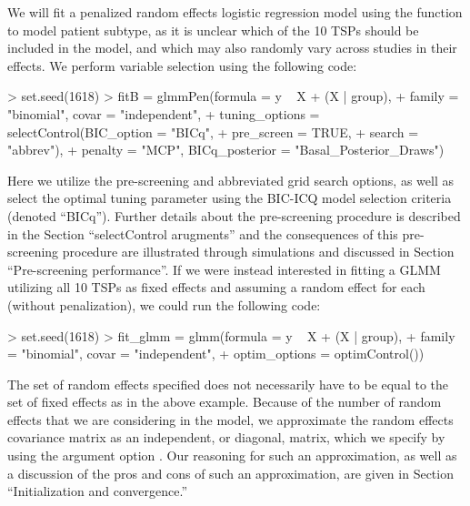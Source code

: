 
We will fit a penalized random effects logistic regression model using the  function to model patient subtype, as it is unclear which of the 10 TSPs should be included in the model, and which may also randomly vary across studies in their effects.  We perform variable selection using the following code:

\begin{example}
> set.seed(1618)
> fitB = glmmPen(formula = y ~ X + (X | group), 
+                family = "binomial", covar = "independent",
+                tuning_options = selectControl(BIC_option = "BICq", 
+                                               pre_screen = TRUE, 
+                                               search = "abbrev"),
+                penalty = "MCP", BICq_posterior = "Basal_Posterior_Draws")
\end{example}

Here we utilize the pre-screening and abbreviated grid search options, as well as select the optimal tuning parameter using the BIC-ICQ model selection criteria (denoted ``BICq''). Further details about the pre-screening procedure is described in the Section ``selectControl arugments'' and the consequences of this pre-screening procedure are illustrated through simulations and discussed in Section ``Pre-screening performance''. If we were instead interested in fitting a GLMM utilizing all 10 TSPs as fixed effects and assuming a random effect for each (without penalization), we could run the following code:

\begin{example}
> set.seed(1618)
> fit_glmm = glmm(formula = y ~ X + (X | group), 
+                  family = "binomial", covar = "independent", 
+                  optim_options = optimControl())
\end{example}

The set of random effects specified does not necessarily have to be equal to the set of fixed effects as in the above example. Because of the number of random effects that we are considering in the model, we approximate the random effects covariance matrix as an independent, or diagonal, matrix, which we specify by using the argument option . Our reasoning for such an approximation, as well as a discussion of the pros and cons of such an approximation, are given in Section ``Initialization and convergence.''

